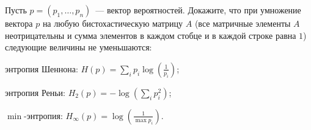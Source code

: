 Пусть $p = (p_1, \dots, p_n)$~--- вектор вероятностей. Докажите, что при умножение вектора $p$ на любую бистохастическую
матрицу $A$ (все матричные элементы $A$ неотрицательны и сумма элементов в каждом стобце и в каждой строке равна $1$)
следующие величины не уменьшаются:
\begin{enumcyr}
    \item энтропия Шеннона: $H(p) = \sum\limits_{i} p_i \log(\frac{1}{p_i})$;
	\item энтропия Реньи: $H_2(p) = - \log(\sum\limits_{i} p_i^2)$;
    \item $\min$-энтропия: $H_{\infty}(p) = \log(\frac{1}{\max p_i})$.
\end{enumcyr}
